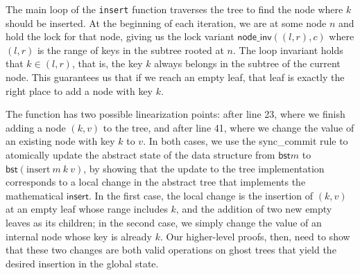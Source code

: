\documentclass[a4paper,USenglish,cleveref, autoref, thm-restate]{lipics-v2021}
\newcommand{\treerep}{\ensuremath{\mathsf{bst}}}
\begin{document}
The main loop of the \lstinline{insert} function traverses the tree to find the node where $k$ should be inserted. At the beginning of each iteration, we are at some node $n$ and hold the lock for that node, giving us the lock variant $\mathsf{node\_inv}((l, r), c)$ where $(l, r)$ is the range of keys in the subtree rooted at $n$. The loop invariant holds that $k \in (l, r)$, that is, the key $k$ always belongs in the subtree of the current node. This guarantees us that if we reach an empty leaf, that leaf is exactly the right place to add a node with key $k$.

The function has two possible linearization points: after line 23, where we finish adding a node $(k, v)$ to the tree, and after line 41, where we change the value of an existing node with key $k$ to $v$. In both cases, we use the \textsf{sync\_commit} rule to atomically update the abstract state of the data structure from $\treerep m$ to $\treerep (\mathrm{insert}\ m\ k\ v)$, by showing that the update to the tree implementation corresponds to a local change in the abstract tree that implements the mathematical $\mathsf{insert}$. In the first case, the local change is the insertion of $(k, v)$ at an empty leaf whose range includes $k$, and the addition of two new empty leaves as its children; in the second case, we simply change the value of an internal node whose key is already $k$. Our higher-level proofs, then, need to show that these two changes are both valid operations on ghost trees that yield the desired insertion in the global state.
  
\end{document}
